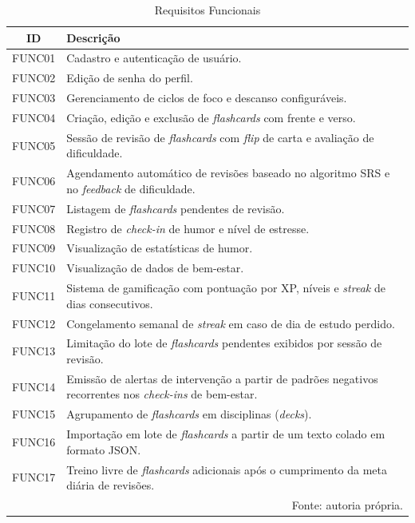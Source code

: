 \begin{table}[H]
\centering
\caption{Requisitos Funcionais}
\label{tab:requisitosfunc}
\begin{tabularx}{\textwidth}{|c|X|}
\hline
\textbf{ID} & \textbf{Descrição} \\
\hline
FUNC01 & Cadastro e autenticação de usuário. \\
\hline
FUNC02 & Edição de senha do perfil. \\
\hline
FUNC03 & Gerenciamento de ciclos de foco e descanso configuráveis. \\
\hline
FUNC04 & Criação, edição e exclusão de \textit{flashcards} com frente e verso. \\
\hline
FUNC05 & Sessão de revisão de \textit{flashcards} com \textit{flip} de carta e avaliação de dificuldade. \\
\hline
FUNC06 & Agendamento automático de revisões baseado no algoritmo SRS e no \textit{feedback} de dificuldade. \\
\hline
FUNC07 & Listagem de \textit{flashcards} pendentes de revisão. \\
\hline
FUNC08 & Registro de \textit{check-in} de humor e nível de estresse. \\
\hline
FUNC09 & Visualização de estatísticas de humor. \\
\hline
FUNC10 & Visualização de dados de bem-estar. \\
\hline
FUNC11 & Sistema de gamificação com pontuação por XP, níveis e \textit{streak} de dias consecutivos. \\
\hline
FUNC12 & Congelamento semanal de \textit{streak} em caso de dia de estudo perdido. \\
\hline
FUNC13 & Limitação do lote de \textit{flashcards} pendentes exibidos por sessão de revisão. \\
\hline
FUNC14 & Emissão de alertas de intervenção a partir de padrões negativos recorrentes nos \textit{check-ins} de bem-estar. \\
\hline
FUNC15 & Agrupamento de \textit{flashcards} em disciplinas (\textit{decks}). \\
\hline
FUNC16 & Importação em lote de \textit{flashcards} a partir de um texto colado em formato JSON. \\
\hline
FUNC17 & Treino livre de \textit{flashcards} adicionais após o cumprimento da meta diária de revisões. \\
\hline
\multicolumn{2}{r}{\small Fonte: autoria própria.} \\
\end{tabularx}
\end{table}

